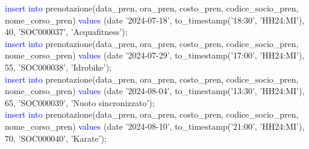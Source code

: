 \documentclass{article}
\begin{document}
\begin{flushleft}
{        \vspace{2mm}
        \hspace*{0.5em}\textcolor{blue}{insert into} prenotazione(data\_pren, ora\_pren, costo\_pren, codice\_socio\_pren, \hspace*{0.5em}nome\_corso\_pren) \textcolor{blue}{values} (date '2024-07-18', to\_timestamp('18:30', 'HH24:MI'), 40, \hspace*{0.5em}'SOC000037', 'Acquafitness'); \\
        \vspace{2mm}
        \hspace*{0.5em}\textcolor{blue}{insert into} prenotazione(data\_pren, ora\_pren, costo\_pren, codice\_socio\_pren, \hspace*{0.5em}nome\_corso\_pren) \textcolor{blue}{values} (date '2024-07-29', to\_timestamp('17:00', 'HH24:MI'), 55, \hspace*{0.5em}'SOC000038', 'Idrobike'); \\
        \vspace{2mm}
        \hspace*{0.5em}\textcolor{blue}{insert into} prenotazione(data\_pren, ora\_pren, costo\_pren, codice\_socio\_pren, \hspace*{0.5em}nome\_corso\_pren) \textcolor{blue}{values} (date '2024-08-04', to\_timestamp('13:30', 'HH24:MI'), 65, \hspace*{0.5em}'SOC000039', 'Nuoto sincronizzato'); \\
        \vspace{2mm}
        \hspace*{0.5em}\textcolor{blue}{insert into} prenotazione(data\_pren, ora\_pren, costo\_pren, codice\_socio\_pren, \hspace*{0.5em}nome\_corso\_pren) \textcolor{blue}{values} (date '2024-08-10', to\_timestamp('21:00', 'HH24:MI'), 70, \hspace*{0.5em}'SOC000040', 'Karate'); \\}
    \end{flushleft}
\end{document}
